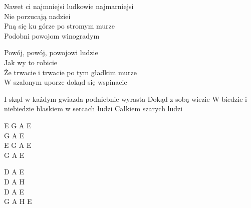 \begin{text}
    Nawet ci najmniejsi ludkowie najmarniejsi\\
    Nie porzucają nadziei\\
    Pną się ku górze po stromym murze\\
    Podobni powojom winogradym

    \vin Powój, powój, powojowi ludzie\\
    \vin Jak wy to robicie\\
    \vin Że trwacie i trwacie po tym gładkim murze\\
    \vin W szalonym uporze dokąd się wspinacie

    I skąd w każdym gwiazda podniebnie wyrasta
    Dokąd z sobą wiezie
    W biedzie i niebiedzie blaskiem w sercach łudzi
    Całkiem szarych ludzi
\end{text}
\begin{chord}
    E G A E\\
    G A E\\
    E G A E\\
    G A E

    D A E\\
    D A H\\
    D A E\\
    G A H E
\end{chord}